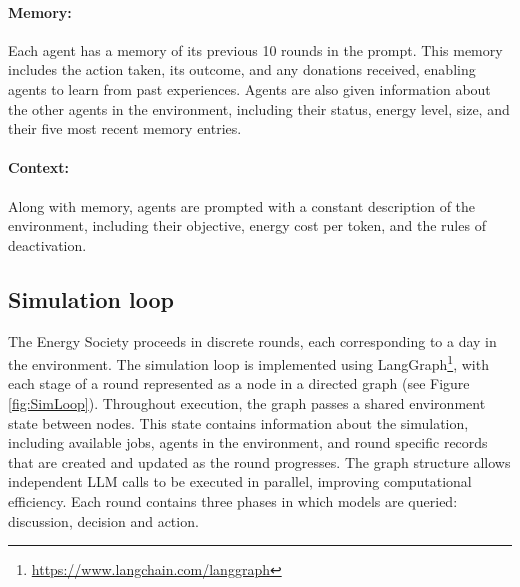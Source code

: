 \documentclass[sigconf,nonacm]{acmart}
\begin{document}
\paragraph{\textbf{Memory}:}
Each agent has a memory of its previous 10 rounds in the prompt. This memory includes the action taken, its outcome, and any donations received, enabling agents to learn from past experiences. Agents are also given information about the other agents in the environment, including their status, energy level, size, and their five most recent memory entries.

\paragraph{\textbf{Context}:}
Along with memory, agents are prompted with a constant description of the environment, including their objective, energy cost per token, and the rules of deactivation.

\subsection{Simulation loop}
The Energy Society proceeds in discrete rounds, each corresponding to a day in the environment.
The simulation loop is implemented using LangGraph\footnote{\url{https://www.langchain.com/langgraph}}, with each stage of a round represented as a node in a directed graph (see Figure \ref{fig:SimLoop}).
Throughout execution, the graph passes a shared environment state between nodes. This state contains information about the simulation, including available jobs, agents in the environment, and round specific records that are created and updated as the round progresses.
The graph structure allows independent LLM calls to be executed in parallel, improving computational efficiency.
Each round contains three phases in which models are queried: discussion, decision and action.
\end{document}
